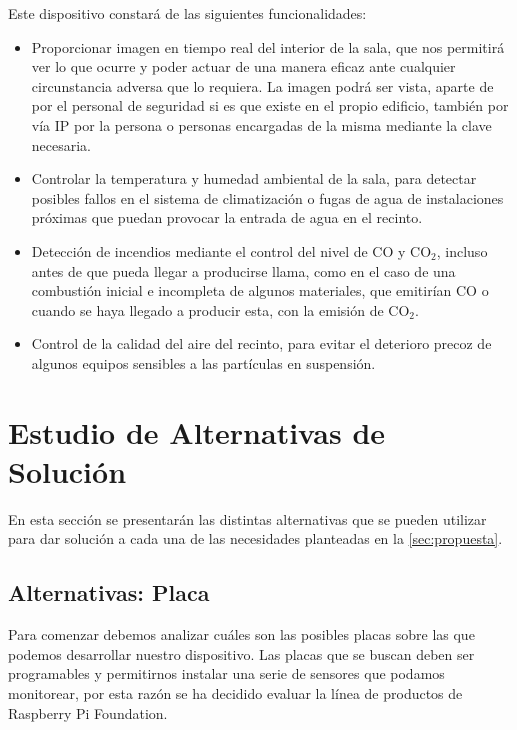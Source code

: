 Este dispositivo constará de las siguientes funcionalidades:
\begin{itemize}
	\item Proporcionar imagen en tiempo real del interior de la sala, que nos permitirá ver lo que ocurre y poder actuar de una manera eficaz ante cualquier circunstancia adversa que lo requiera. La imagen podrá ser vista, aparte de por el personal de seguridad si es que existe en el propio edificio, también por vía IP por la persona o personas encargadas de la misma mediante la clave necesaria.
	\item Controlar la temperatura y humedad ambiental de la sala, para detectar posibles fallos en el sistema de climatización o fugas de agua de instalaciones próximas que puedan provocar la entrada de agua en el recinto.
	\item Detección de incendios mediante el control del nivel de CO y CO$_2$, incluso antes de que pueda llegar a producirse llama, como en el caso de una combustión inicial e incompleta de algunos materiales, que emitirían CO o cuando se haya llegado a producir esta, con la emisión de CO$_2$.
	\item Control de la calidad del aire del recinto, para evitar el deterioro precoz de algunos equipos sensibles a las partículas en suspensión.
\end{itemize}

\section{Estudio de Alternativas de Solución}\label{sec:estudio-de-alternativas-de-solución}
En esta sección se presentarán las distintas alternativas que se pueden utilizar para dar solución a cada una de las necesidades planteadas en la \autoref{sec:propuesta}.

\subsection{Alternativas: Placa}\label{subsec:altPlacas}
Para comenzar debemos analizar cuáles son las posibles placas sobre las que podemos desarrollar nuestro dispositivo. Las placas que se buscan deben ser programables y permitirnos instalar una serie de sensores que podamos monitorear, por esta razón se ha decidido evaluar la línea de productos de Raspberry Pi Foundation.

\begin{figure}[H]
	{\def\svgwidth{.21\textwidth}
		}\label{fig:logoRaspberry}
\end{figure}

